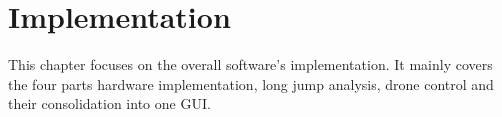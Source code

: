 \graphicspath{{./figures/}}
\chapter{Implementation}
This chapter focuses on the overall software's implementation.
It mainly covers the four parts hardware implementation, long jump analysis,
drone control and their consolidation into one \ac{GUI}.
